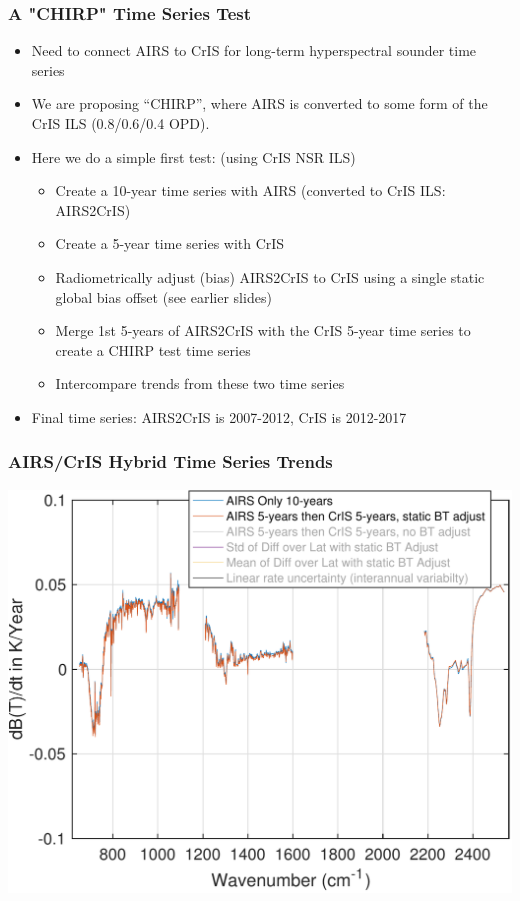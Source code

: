 \documentclass[10pt,t]{beamer}
\begin{document}
    

\begin{frame}
  \frametitle{A "CHIRP" Time Series Test}
  \begin{itemize}
  \item Need to connect AIRS to CrIS for long-term hyperspectral sounder time series
  \item We are proposing ``CHIRP'', where AIRS is converted to some form of the CrIS ILS (0.8/0.6/0.4 OPD).
  \item Here we do a simple first test: (using CrIS NSR ILS)
    \begin{itemize}
    \item Create a 10-year time series with AIRS (converted to CrIS ILS: AIRS2CrIS)
    \item Create a 5-year time series with CrIS
    \item Radiometrically adjust (bias) AIRS2CrIS to CrIS using a single static global bias offset (see earlier slides)
    \item Merge 1st 5-years of AIRS2CrIS with the CrIS 5-year time series to create a CHIRP test time series
    \item Intercompare trends from these two time series
    \end{itemize}
  \item Final time series:  AIRS2CrIS is 2007-2012, CrIS is 2012-2017
  \end{itemize}
\end{frame}
\begin{frame}
  \frametitle{AIRS/CrIS Hybrid Time Series Trends}
  \centering
  \includegraphics[width=0.8\linewidth]{Figs/trend_airs_vs_airs2cris.pdf}
\end{frame}
\end{document}
